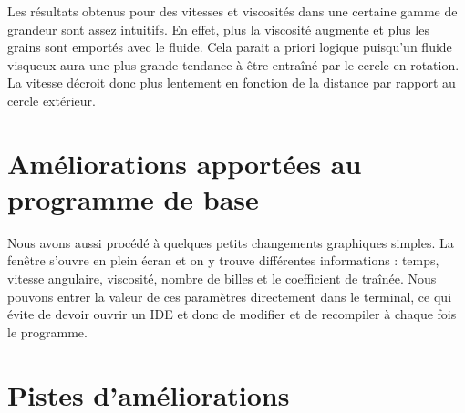 \documentclass{article}
\theoremstyle{definition}
\begin{document}
%
%
%

Les résultats obtenus pour des vitesses et viscosités dans une certaine gamme de grandeur sont assez intuitifs. En effet, plus la viscosité augmente et plus les grains sont emportés avec le fluide. Cela parait a priori logique puisqu'un fluide visqueux aura une plus grande tendance à être entraîné par le cercle en rotation. La vitesse décroit donc plus lentement en fonction de la distance par rapport au cercle extérieur. \\

\section{Améliorations apportées au programme de base}

Nous avons aussi procédé à quelques petits changements graphiques simples. La fenêtre s'ouvre en plein écran et on y trouve différentes informations : temps, vitesse angulaire, viscosité, nombre de billes et le coefficient de traînée. Nous pouvons entrer la valeur de ces paramètres directement dans le terminal, ce qui évite de devoir ouvrir un IDE et donc de modifier et de recompiler à chaque fois le programme. 

\section{Pistes d'améliorations}
\end{document}
